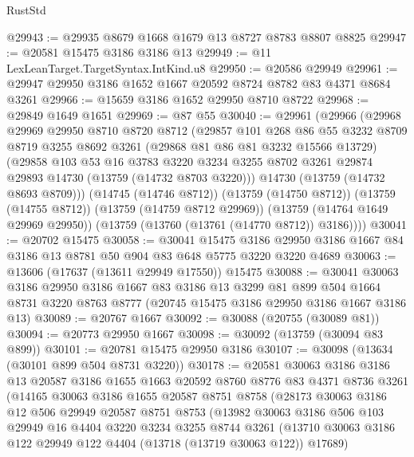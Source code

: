 \begin{lexlean}{RustStd}
\begin{coremodule}
@29943 := @29935 @8679 @1668 @1679 @13 @8727 @8783 @8807 @8825
@29947 := @20581 @15475 @3186 @3186 @13
@29949 := @11 LexLeanTarget.TargetSyntax.IntKind.u8
@29950 := @20586 @29949
@29961 := @29947 @29950 @3186 @1652 @1667 @20592 @8724 @8782 @83 @4371 @8684 @3261
@29966 := @15659 @3186 @1652 @29950 @8710 @8722
@29968 := @29849 @1649 @1651
@29969 := @87 @55
@30040 := @29961
    (@29966
      (@29968
        @29969
        @29950
        @8710
        @8720
        @8712
        (@29857
          @101
          @268
          @86
          @55
          @3232
          @8709
          @8719
          @3255
          @8692
          @3261
          (@29868 @81 @86 @81 @3232 @15566 @13729)
          (@29858
            @103
            @53
            @16
            @3783
            @3220
            @3234
            @3255
            @8702
            @3261
            @29874
            @29893
            @14730
            (@13759 (@14732 @8703 @3220)))
          @14730
          (@13759 (@14732 @8693 @8709)))
        (@14745 (@14746 @8712))
        (@13759 (@14750 @8712))
        (@13759 (@14755 @8712))
        (@13759 (@14759 @8712 @29969))
        (@13759 (@14764 @1649 @29969 @29950))
        (@13759 (@13760 (@13761 (@14770 @8712)) @3186))))
@30041 := @20702 @15475
@30058 := @30041
    @15475
    @3186
    @29950
    @3186
    @1667
    @84
    @3186
    @13
    @8781
    @50
    @904
    @83
    @648
    @5775
    @3220
    @3220
    @4689
@30063 := @13606 (@17637 (@13611 @29949 @17550)) @15475
@30088 := @30041
    @30063
    @3186
    @29950
    @3186
    @1667
    @83
    @3186
    @13
    @3299
    @81
    @899
    @504
    @1664
    @8731
    @3220
    @8763
    @8777
    (@20745 @15475 @3186 @29950 @3186 @1667 @3186 @13)
@30089 := @20767 @1667
@30092 := @30088 (@20755 (@30089 @81))
@30094 := @20773 @29950 @1667
@30098 := @30092 (@13759 (@30094 @83 @899))
@30101 := @20781 @15475 @29950 @3186
@30107 := @30098 (@13634 (@30101 @899 @504 @8731 @3220))
@30178 := @20581
    @30063
    @3186
    @3186
    @13
    @20587
    @3186
    @1655
    @1663
    @20592
    @8760
    @8776
    @83
    @4371
    @8736
    @3261
    (@14165
      @30063
      @3186
      @1655
      @20587
      @8751
      @8758
      (@28173
        @30063
        @3186
        @12
        @506
        @29949
        @20587
        @8751
        @8753
        (@13982
          @30063
          @3186
          @506
          @103
          @29949
          @16
          @4404
          @3220
          @3234
          @3255
          @8744
          @3261
          (@13710 @30063 @3186 @122 @29949 @122 @4404 (@13718 (@13719 @30063 @122)) @17689)

\end{coremodule}
\end{lexlean}
